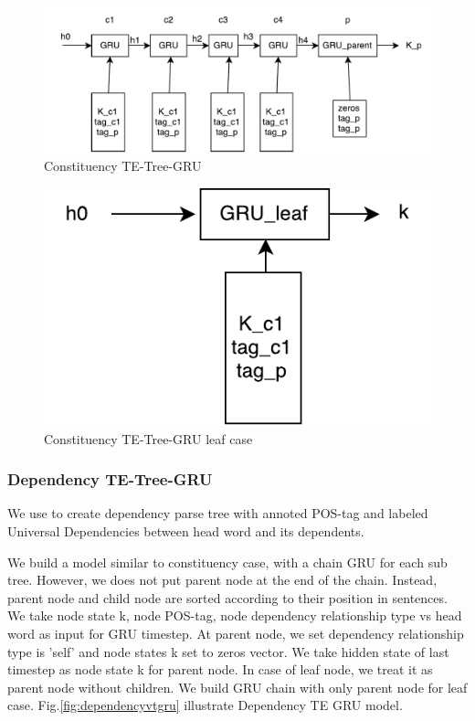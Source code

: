 \begin{figure}[H]
    \centering
    \includegraphics[width=0.9\linewidth]{figure/cvtgru}
    \caption[Constituency TE-Tree-GRU]{Constituency TE-Tree-GRU}
    \label{fig:cvtgru}
\end{figure}

\begin{figure}[H]
    \centering
    \includegraphics[width=0.4\linewidth]{figure/gruleaf}
    \caption[Constituency TE-Tree-GRU leaf case]{Constituency TE-Tree-GRU leaf case}
    \label{fig:gruleaf}
\end{figure}



\subsubsection{Dependency TE-Tree-GRU} \label{sec:VTtreeDependency}
We use \cite{manning2014stanford} to create dependency parse tree with annoted POS-tag and labeled Universal Dependencies between head word and its dependents.

We build a model similar to constituency case, with a chain GRU for each sub tree. However, we does not put parent node at the end of the chain. Instead, parent node and child node are sorted according to their position in sentences. We take node state k, node POS-tag, node dependency relationship type vs head word as input for GRU timestep. At parent node, we set dependency relationship type is 'self' and node states k set to zeros vector. We take hidden state of last timestep as node state k for parent node. In case of leaf node, we treat it as parent node without children. We build GRU chain with only parent node for leaf case. Fig.\ref{fig:dependencyvtgru} illustrate Dependency TE GRU model.


